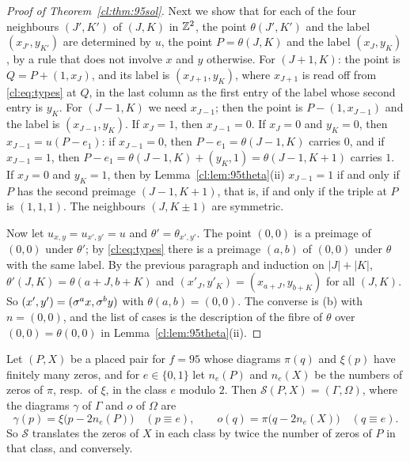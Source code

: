 \begin{proof}[Proof of Theorem~\ref{cl:thm:95sol}]
Next we show that for each of the four neighbours $(J',K')$ of $(J,K)$ in $\mathbb{Z}^2$, the point $\theta(J',K')$ and the label $(x_{J'},y_{K'})$ are determined by $u$, the point $P=\theta(J,K)$ and the label $(x_J,y_K)$, by a rule that does not involve $x$ and $y$ otherwise. For $(J+1,K)$: the point is $Q=P+(1,x_J)$, and its label is $(x_{J+1},y_K)$, where $x_{J+1}$ is read off from \eqref{cl:eq:types} at $Q$, in the last column as the first entry of the label whose second entry is $y_K$. For $(J-1,K)$ we need $x_{J-1}$; then the point is $P-(1,x_{J-1})$ and the label is $(x_{J-1},y_K)$. If $x_J=1$, then $x_{J-1}=0$. If $x_J=0$ and $y_K=0$, then $x_{J-1}=u(P-e_1)$: if $x_{J-1}=0$, then $P-e_1=\theta(J-1,K)$ carries $0$, and if $x_{J-1}=1$, then $P-e_1=\theta(J-1,K)+(y_K,1)=\theta(J-1,K+1)$ carries $1$. If $x_J=0$ and $y_K=1$, then by Lemma~\ref{cl:lem:95theta}(ii) $x_{J-1}=1$ if and only if $P$ has the second preimage $(J-1,K+1)$, that is, if and only if the triple at $P$ is $(1,1,1)$. The neighbours $(J,K\pm1)$ are symmetric.

Now let $u_{x,y}=u_{x',y'}=u$ and $\theta'=\theta_{x',y'}$. The point $(0,0)$ is a preimage of $(0,0)$ under $\theta'$; by \eqref{cl:eq:types} there is a preimage $(a,b)$ of $(0,0)$ under $\theta$ with the same label. By the previous paragraph and induction on $|J|+|K|$, $\theta'(J,K)=\theta(a+J,b+K)$ and $(x'_J,y'_K)=(x_{a+J},y_{b+K})$ for all $(J,K)$. So $(x',y')=(\sigma^ax,\sigma^by)$ with $\theta(a,b)=(0,0)$. The converse is (b) with $n=(0,0)$, and the list of cases is the description of the fibre of $\theta$ over $(0,0)=\theta(0,0)$ in Lemma~\ref{cl:lem:95theta}(ii).
\end{proof}

\begin{corollary}\label{cl:cor:95trans}
Let $(P,X)$ be a placed pair for $f=95$ whose diagrams $\pi(q)$ and $\xi(p)$ have finitely many zeros, and for $e\in\{0,1\}$ let $n_e(P)$ and $n_e(X)$ be the numbers of zeros of $\pi$, resp.\ of $\xi$, in the class $e$ modulo $2$. Then $\mathcal S(P,X)=(\Gamma,\Omega)$, where the diagrams $\gamma$ of $\Gamma$ and $o$ of $\Omega$ are
\[
\gamma(p)=\xi\bigl(p-2n_e(P)\bigr)\quad(p\equiv e),\qquad o(q)=\pi\bigl(q-2n_e(X)\bigr)\quad(q\equiv e).
\]
So $\mathcal S$ translates the zeros of $X$ in each class by twice the number of zeros of $P$ in that class, and conversely.
\end{corollary}

